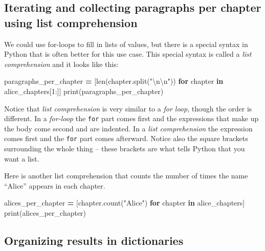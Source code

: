 \documentclass[]{book}
\newenvironment{Shaded}{\begin{snugshade}}{\end{snugshade}}
\newcommand{\KeywordTok}[1]{\textcolor[rgb]{0.13,0.29,0.53}{\textbf{#1}}}
\newcommand{\DecValTok}[1]{\textcolor[rgb]{0.00,0.00,0.81}{#1}}
\newcommand{\CharTok}[1]{\textcolor[rgb]{0.31,0.60,0.02}{#1}}
\newcommand{\StringTok}[1]{\textcolor[rgb]{0.31,0.60,0.02}{#1}}
\newcommand{\ControlFlowTok}[1]{\textcolor[rgb]{0.13,0.29,0.53}{\textbf{#1}}}
\newcommand{\OperatorTok}[1]{\textcolor[rgb]{0.81,0.36,0.00}{\textbf{#1}}}
\newcommand{\BuiltInTok}[1]{#1}
\newcommand{\NormalTok}[1]{#1}
\begin{document}
\subsection{Iterating and collecting paragraphs per chapter using list
comprehension}\label{iterating-and-collecting-paragraphs-per-chapter-using-list-comprehension}

We could use for-loops to fill in lists of values, but there is a
special syntax in Python that is often better for this use case. This
special syntax is called a \emph{list comprehension} and it looks like
this:

\begin{Shaded}
\begin{Highlighting}[]
\NormalTok{paragraphs_per_chapter }\OperatorTok{=}\NormalTok{ [}\BuiltInTok{len}\NormalTok{(chapter.split(}\StringTok{"}\CharTok{\textbackslash{}n\textbackslash{}n}\StringTok{"}\NormalTok{)) }
                          \ControlFlowTok{for}\NormalTok{ chapter }\KeywordTok{in}\NormalTok{ alice_chapters[}\DecValTok{1}\NormalTok{:]]}
\BuiltInTok{print}\NormalTok{(paragraphs_per_chapter)}
\end{Highlighting}
\end{Shaded}

Notice that \emph{list comprehension} is very similar to a \emph{for
loop}, though the order is different. In a \emph{for-loop} the
\texttt{for} part comes first and the expressions that make up the body
come second and are indented. In a \emph{list comprehension} the
expression comes first and the \texttt{for} part comes afterward. Notice
also the square brackets surrounding the whole thing -- these brackets
are what tells Python that you want a list.

Here is another list comprehension that counts the number of times the
name ``Alice'' appears in each chapter.

\begin{Shaded}
\begin{Highlighting}[]
\NormalTok{alices_per_chapter }\OperatorTok{=}\NormalTok{ [chapter.count(}\StringTok{"Alice"}\NormalTok{) }\ControlFlowTok{for}\NormalTok{ chapter }\KeywordTok{in}\NormalTok{ alice_chapters]}
\BuiltInTok{print}\NormalTok{(alices_per_chapter)}
\end{Highlighting}
\end{Shaded}

\subsection{Organizing results in
dictionaries}\label{organizing-results-in-dictionaries}
\end{document}
